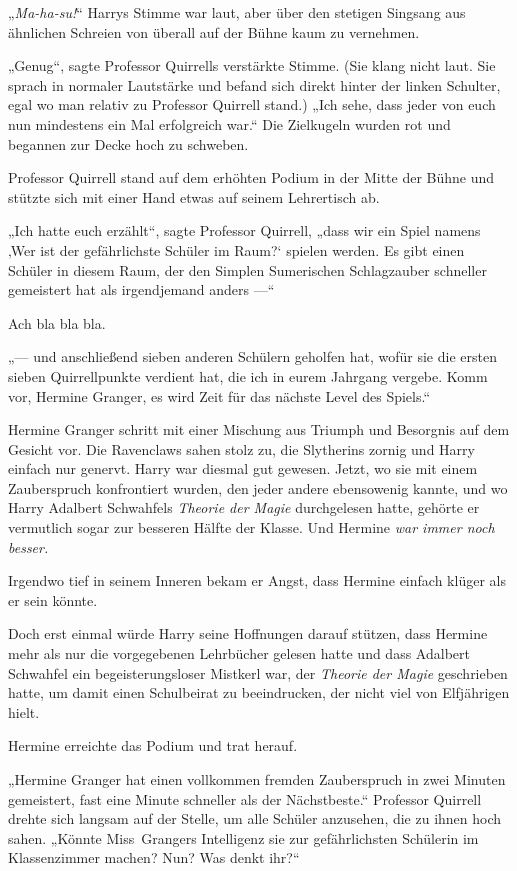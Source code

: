 {„\emph{Ma-ha-su!}“ Harrys Stimme war laut, aber über den stetigen Singsang aus ähnlichen Schreien von überall auf der Bühne kaum zu vernehmen.

„Genug“, sagte Professor Quirrells verstärkte Stimme. (Sie klang nicht laut. Sie sprach in normaler Lautstärke und befand sich direkt hinter der linken Schulter, egal wo man relativ zu Professor Quirrell stand.) „Ich sehe, dass jeder von euch nun mindestens ein Mal erfolgreich war.“ Die Zielkugeln wurden rot und begannen zur Decke hoch zu schweben.

Professor Quirrell stand auf dem erhöhten Podium in der Mitte der Bühne und stützte sich mit einer Hand etwas auf seinem Lehrertisch ab.

„Ich hatte euch erzählt“, sagte Professor Quirrell, „dass wir ein Spiel namens ‚Wer ist der gefährlichste Schüler im Raum?` spielen werden. Es gibt einen Schüler in diesem Raum, der den Simplen Sumerischen Schlagzauber schneller gemeistert hat als irgendjemand anders —“

Ach bla bla bla.

„— und anschließend sieben anderen Schülern geholfen hat, wofür sie die ersten sieben Quirrellpunkte verdient hat, die ich in eurem Jahrgang vergebe. Komm vor, Hermine Granger, es wird Zeit für das nächste Level des Spiels.“

Hermine Granger schritt mit einer Mischung aus Triumph und Besorgnis auf dem Gesicht vor. Die Ravenclaws sahen stolz zu, die Slytherins zornig und Harry einfach nur genervt. Harry war diesmal gut gewesen. Jetzt, wo sie mit einem Zauberspruch konfrontiert wurden, den jeder andere ebensowenig kannte, und wo Harry Adalbert Schwahfels \emph{Theorie der Magie} durchgelesen hatte, gehörte er vermutlich sogar zur besseren Hälfte der Klasse. Und Hermine \emph{war immer noch besser.}

Irgendwo tief in seinem Inneren bekam er Angst, dass Hermine einfach klüger als er sein könnte.

Doch erst einmal würde Harry seine Hoffnungen darauf stützen, dass Hermine mehr als nur die vorgegebenen Lehrbücher gelesen hatte und dass Adalbert Schwahfel ein begeisterungsloser Mistkerl war, der \emph{Theorie der Magie} geschrieben hatte, um damit einen Schulbeirat zu beeindrucken, der nicht viel von Elfjährigen hielt.

Hermine erreichte das Podium und trat herauf.

„Hermine Granger hat einen vollkommen fremden Zauberspruch in zwei Minuten gemeistert, fast eine Minute schneller als der Nächstbeste.“ Professor Quirrell drehte sich langsam auf der Stelle, um alle Schüler anzusehen, die zu ihnen hoch sahen. „Könnte Miss~Grangers Intelligenz sie zur gefährlichsten Schülerin im Klassenzimmer machen? Nun? Was denkt ihr?“

}
